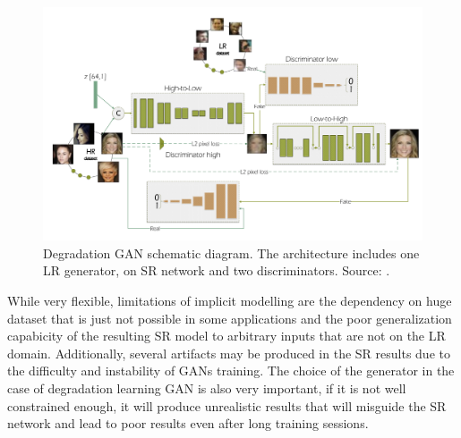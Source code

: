         \begin{figure}[H]
            \centering
            \includegraphics[width=\textwidth]{Includes/2-degradation-gan.png}
            \caption{Degradation GAN schematic diagram. The architecture includes one LR generator, on SR network and two discriminators. Source: \cite{bulat2018learn}.}    
            \label{fig:2-degradation-gan}
        \end{figure}
        
    
        While very flexible, limitations of implicit modelling are the dependency on huge dataset that is just not possible in some applications and the poor generalization capabicity of the resulting SR model to arbitrary inputs that are not on the LR domain. 
        Additionally, several artifacts may be produced in the SR results due to the difficulty and instability of GANs training.
        The choice of the generator in the case of degradation learning GAN is also very important, if it is not well constrained enough, it will produce unrealistic results that will misguide the SR network and lead to poor results even after long training sessions.
         
         




        
























        
        
        

        

        

        










        

\clearpage